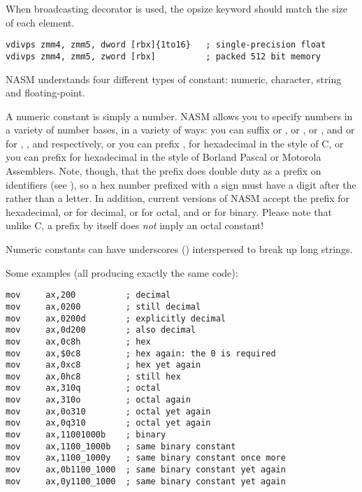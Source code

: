 When broadcasting decorator is used, the opsize keyword should match
the size of each element.

\begin{lstlisting}
vdivps zmm4, zmm5, dword [rbx]{1to16}   ; single-precision float
vdivps zmm4, zmm5, zword [rbx]          ; packed 512 bit memory
\end{lstlisting}


NASM understands four different types of constant: numeric,
character, string and floating-point.


A numeric constant is simply a number. NASM allows you to specify
numbers in a variety of number bases, in a variety of ways: you can
suffix  or ,  or ,  or
, and  or  for ,
,  and  respectively,
or you can prefix , for hexadecimal in the style of C, or you
can prefix \code{\$} for hexadecimal in the style of Borland Pascal or
Motorola Assemblers. Note, though, that the \index{\$} \code{\$}
prefix does double duty as a prefix on identifiers (see ),
so a hex number prefixed with a \code{\$} sign must have a digit after the
\code{\$} rather than a letter. In addition, current versions of NASM accept
the prefix  for hexadecimal,  or  for decimal,
 or  for octal, and  or  for binary.
Please note that unlike C, a  prefix by itself does \emph{not} imply
an octal constant!

Numeric constants can have underscores (\code{\_}) interspersed to break
up long strings.

Some examples (all producing exactly the same code):

\begin{lstlisting}
mov     ax,200          ; decimal
mov     ax,0200         ; still decimal
mov     ax,0200d        ; explicitly decimal
mov     ax,0d200        ; also decimal
mov     ax,0c8h         ; hex
mov     ax,$0c8         ; hex again: the 0 is required
mov     ax,0xc8         ; hex yet again
mov     ax,0hc8         ; still hex
mov     ax,310q         ; octal
mov     ax,310o         ; octal again
mov     ax,0o310        ; octal yet again
mov     ax,0q310        ; octal yet again
mov     ax,11001000b    ; binary
mov     ax,1100_1000b   ; same binary constant
mov     ax,1100_1000y   ; same binary constant once more
mov     ax,0b1100_1000  ; same binary constant yet again
mov     ax,0y1100_1000  ; same binary constant yet again
\end{lstlisting}

